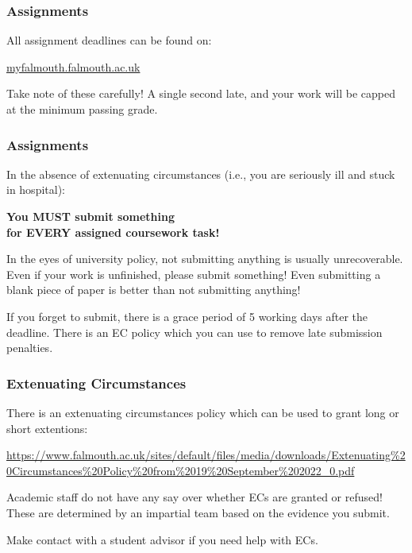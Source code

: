\begin{frame}
	\frametitle{Assignments}
		
	All assignment deadlines can be found on:
	
	\vspace{1em}
	
	\indent \url{myfalmouth.falmouth.ac.uk}
	
	\vspace{1em}
	
	Take note of these carefully! A single second late, and your work will be capped at the minimum passing grade.
	
\end{frame}

\begin{frame}
	\frametitle{Assignments}
		
	In the absence of extenuating circumstances (i.e., you are seriously ill and stuck in hospital):
	
	\begin{Large}
		\begin{center}
			\textbf{You MUST submit something \\ for EVERY assigned coursework task!}
		\end{center}
	\end{Large}
	
	In the eyes of university policy, not submitting anything is usually unrecoverable. Even if your work is unfinished, please submit something! Even submitting a blank piece of paper is better than not submitting anything! 
	
		\vspace{0.5em}
	
	If you forget to submit, there is a grace period of 5 working days after the deadline. There is an EC policy which you can use to remove late submission penalties. 
	
\end{frame}

\begin{frame}
	\frametitle{Extenuating Circumstances}
		
	There is an extenuating circumstances policy which can be used to grant long or short extentions:
	
	\vspace{1em}
	
	\url{https://www.falmouth.ac.uk/sites/default/files/media/downloads/Extenuating\%20Circumstances\%20Policy\%20from\%2019\%20September\%202022_0.pdf}
	
	\vspace{1em}
	
	Academic staff do not have any say over whether ECs are granted or refused! These are determined by an impartial team based on the evidence you submit. 
	
		\vspace{1em}
	
	Make contact with a student advisor if you need help with ECs. 
	
\end{frame}

